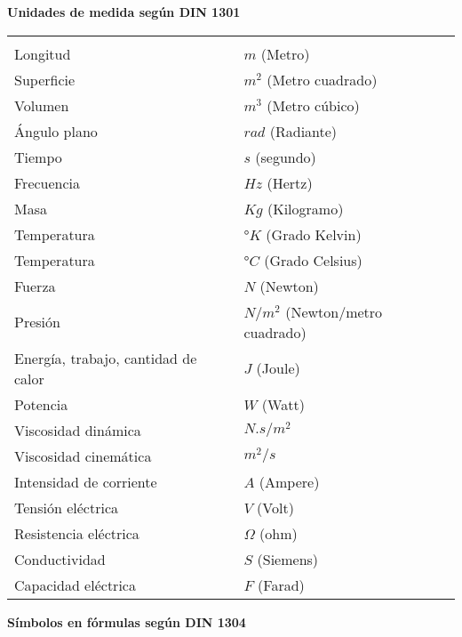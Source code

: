 
\begin{center}
	\textbf{Unidades de medida según DIN 1301}
\end{center}

\begin{mytable}[H]
	\centering
	\begin{tabular}{ll}
		\multicolumn{1}{c}{} & \multicolumn{1}{c}{} \\
		Longitud & $m$ (Metro) \\	
		Superficie & $m^2$ (Metro cuadrado) \\
		Volumen & $m^3$ (Metro cúbico) \\
		Ángulo plano & $rad$ (Radiante) \\
		Tiempo & $s$ (segundo) \\
		Frecuencia & $Hz$ (Hertz) \\
		Masa & $Kg$ (Kilogramo) \\
		Temperatura & °$K$ (Grado Kelvin) \\
		Temperatura & °$C$ (Grado Celsius) \\
		Fuerza & $N$ (Newton) \\
		Presión & $N/m^2$ (Newton/metro cuadrado) \\
		Energía, trabajo, cantidad de calor & $J$ (Joule) \\
		Potencia & $W$ (Watt) \\
		Viscosidad dinámica & $N.s/m^2$ \\
		Viscosidad cinemática & $m^2/s$ \\
		Intensidad de corriente & $A$ (Ampere) \\
		Tensión eléctrica & $V$ (Volt) \\
		Resistencia eléctrica & $\Omega$ (ohm) \\
		Conductividad & $S$ (Siemens) \\
		Capacidad eléctrica & $F$ (Farad) \\
	\end{tabular}
\end{mytable}

\newpage 
\begin{center}
	\textbf{Símbolos en fórmulas según DIN 1304}
\end{center}

